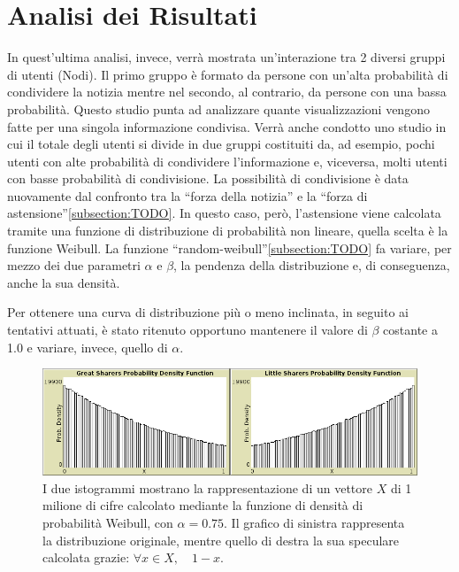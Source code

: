 \newpage
\section{Analisi dei Risultati}
\label{section:analisirisultati}






In quest'ultima analisi, invece, verrà mostrata un'interazione tra 2 diversi gruppi di utenti (Nodi).
Il primo gruppo è formato da persone con un'alta probabilità di condividere la notizia 
mentre nel secondo, al contrario, da persone con una bassa probabilità.
Questo studio punta ad analizzare quante visualizzazioni vengono fatte per una singola informazione condivisa.
Verrà anche condotto uno studio in cui il totale degli utenti si divide in due gruppi costituiti da, ad esempio, 
pochi utenti con alte probabilità di condividere l'informazione e, viceversa, 
molti utenti con basse probabilità di condivisione.
La possibilità di condivisione è data nuovamente dal confronto tra 
la ``forza della notizia'' e la ``forza di astensione''\ref{subsection:TODO}. 
In questo caso, però, l'astensione viene calcolata tramite una funzione di distribuzione di probabilità non lineare,
quella scelta è la funzione Weibull.
La funzione ``random-weibull''\ref{subsection:TODO} fa variare, per mezzo dei due parametri $\alpha$ e $\beta$, la pendenza della distribuzione
e, di conseguenza, anche la sua densità.

Per ottenere una curva di distribuzione più o meno inclinata, in seguito ai tentativi attuati, 
è stato ritenuto opportuno mantenere il valore di $\beta$ costante a 1.0 e variare, invece, quello di $\alpha$.


\begin{figure}[!ht]
\centerline {
  \includegraphics[width=1.1\textwidth]{img/weibull-alpha-0.75.png}
}
\caption{I due istogrammi mostrano la rappresentazione di un vettore $X$ di 1 milione di cifre 
calcolato mediante la funzione di densità di probabilità Weibull, con $\alpha = 0.75$.
Il grafico di sinistra rappresenta la distribuzione originale, 
mentre quello di destra la sua speculare calcolata grazie: $\forall x \in X, \quad 1 - x$.}
\label{img:weibull_alpha_0_75}
\end{figure}

